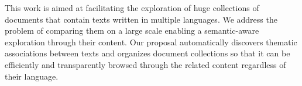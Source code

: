     

This work is aimed at facilitating the exploration of huge collections of documents that contain texts written in multiple languages. We address the problem of comparing them on a large scale enabling a semantic-aware exploration through their content. Our proposal automatically discovers thematic associations between texts and organizes document collections so that it can be efficiently and transparently browsed through the related content regardless of their language.








